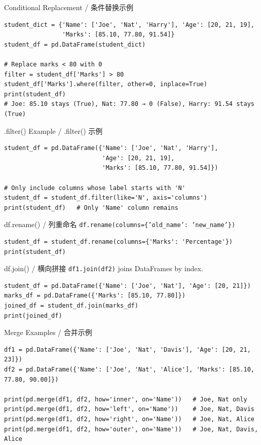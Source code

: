 \documentclass[11pt,a4paper]{report}
\let\oldtexttt\texttt
\renewcommand{\texttt}[1]{\textcolor{mainblue}{\oldtexttt{#1}}}
\begin{document}
\begin{examplebox}{Conditional Replacement / 条件替换示例}
\begin{lstlisting}
student_dict = {'Name': ['Joe', 'Nat', 'Harry'], 'Age': [20, 21, 19],
                'Marks': [85.10, 77.80, 91.54]}
student_df = pd.DataFrame(student_dict)

# Replace marks < 80 with 0
filter = student_df['Marks'] > 80
student_df['Marks'].where(filter, other=0, inplace=True)
print(student_df)
# Joe: 85.10 stays (True), Nat: 77.80 → 0 (False), Harry: 91.54 stays (True)
\end{lstlisting}
\end{examplebox}

\begin{examplebox}{.filter() Example / .filter() 示例}
\begin{lstlisting}
student_df = pd.DataFrame({'Name': ['Joe', 'Nat', 'Harry'],
                           'Age': [20, 21, 19],
                           'Marks': [85.10, 77.80, 91.54]})

# Only include columns whose label starts with 'N'
student_df = student_df.filter(like='N', axis='columns')
print(student_df)   # Only 'Name' column remains
\end{lstlisting}
\end{examplebox}

\begin{examplebox}{df.rename() / 列重命名}
    \texttt{df.rename(columns=\{'old\_name': 'new\_name'\})}
\begin{lstlisting}
student_df = student_df.rename(columns={'Marks': 'Percentage'})
print(student_df)
\end{lstlisting}
\end{examplebox}

\begin{examplebox}{df.join() / 横向拼接}
    \texttt{df1.join(df2)} joins DataFrames by index.
\begin{lstlisting}
student_df = pd.DataFrame({'Name': ['Joe', 'Nat'], 'Age': [20, 21]})
marks_df = pd.DataFrame({'Marks': [85.10, 77.80]})
joined_df = student_df.join(marks_df)
print(joined_df)
\end{lstlisting}
\end{examplebox}

\begin{examplebox}{Merge Examples / 合并示例}
\begin{lstlisting}
df1 = pd.DataFrame({'Name': ['Joe', 'Nat', 'Davis'], 'Age': [20, 21, 23]})
df2 = pd.DataFrame({'Name': ['Joe', 'Nat', 'Alice'], 'Marks': [85.10, 77.80, 90.00]})

print(pd.merge(df1, df2, how='inner', on='Name'))   # Joe, Nat only
print(pd.merge(df1, df2, how='left', on='Name'))    # Joe, Nat, Davis
print(pd.merge(df1, df2, how='right', on='Name'))   # Joe, Nat, Alice
print(pd.merge(df1, df2, how='outer', on='Name'))   # Joe, Nat, Davis, Alice
\end{lstlisting}
\end{examplebox}
\end{document}
